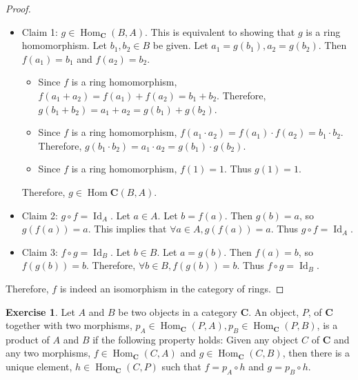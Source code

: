 \documentclass[12pt, psamsfonts]{amsart}
\theoremstyle{definition}
\newtheorem{exer}[thm]{Exercise}
\theoremstyle{remark}
\DeclareMathOperator{\Hom}{Hom}
\DeclareMathOperator{\Id}{Id}
\numberwithin{equation}{section}
\begin{document}
\begin{proof}
\begin{itemize}
  \item
    Claim 1: $g \in \Hom_{\mathbf{C}}(B, A)$.
    This is equivalent to showing that $g$ is a ring homomorphism.
    Let $b_1, b_2 \in B$ be given.
    Let $a_1 = g(b_1), a_2 = g(b_2)$.
    Then $f(a_1) = b_1$ and $f(a_2) = b_2$.
    \begin{itemize}
      \item
        Since $f$ is a ring homomorphism, $f(a_1 + a_2) = f(a_1) + f(a_2) = b_1 + b_2$.
        Therefore, $g(b_1 + b_2) = a_1 + a_2 = g(b_1) + g(b_2)$.
      \item
        Since $f$ is a ring homomorphism, $f(a_1 \cdot a_2) = f(a_1) \cdot f(a_2) = b_1 \cdot b_2$.
        Therefore, $g(b_1 \cdot b_2) = a_1 \cdot a_2 = g(b_1) \cdot g(b_2)$.
      \item
        Since $f$ is a ring homomorphism, $f(1) = 1$.
        Thus $g(1) = 1$.
    \end{itemize}
    Therefore, $g \in \Hom{\mathbf{C}}(B, A)$.
  \item
    Claim 2: $ g \circ f = \Id_A$.
    Let $a \in A$.
    Let $b = f(a)$.
    Then $g(b) = a$, so $g(f(a)) = a$.
    This implies that $\forall a \in A, g(f(a)) = a$.
    Thus $g \circ f = \Id_A$.
  \item
    Claim 3: $ f \circ g = \Id_B$.
    Let $b \in B$.
    Let $a = g(b)$.
    Then $f(a) = b$, so $f(g(b)) = b$.
    Therefore, $\forall b \in B, f(g(b)) = b$.
    Thus $f \circ g = \Id_B$.
\end{itemize}

Therefore, $f$ is indeed an isomorphism in the category of rings.
\end{proof}

\begin{exer}
  Let $A$ and $B$ be two objects in a category $\mathbf{C}$.
  An object, $P$, of $\mathbf{C}$ together with two morphisms, $p_A \in \Hom_{\mathbf{C}}(P, A), p_B \in \Hom_{\mathbf{C}}(P, B)$, is a product of $A$ and $B$ if the following property holds:
  Given any object $C$ of $\mathbf{C}$ and any two morphisms, $f \in \Hom_{\mathbf{C}}(C, A)$ and $g \in \Hom_{\mathbf{C}}(C, B)$, then there is a unique element, $h \in \Hom_{\mathbf{C}}(C, P)$ such that $f = p_A \circ h$ and $g = p_B \circ h$.
\end{exer}
\end{document}
